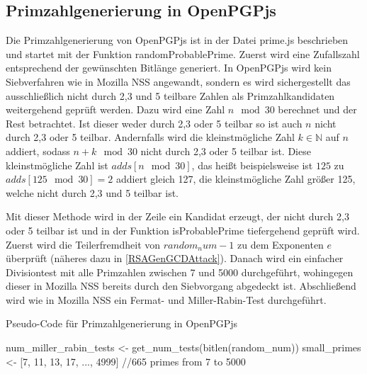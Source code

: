 \subsection{Primzahlgenerierung in OpenPGPjs}

Die Primzahlgenerierung von OpenPGPjs ist in der Datei prime.js beschrieben und startet mit der Funktion randomProbablePrime.
Zuerst wird eine Zufallszahl entsprechend der gewünschten Bitlänge generiert.
In OpenPGPjs wird kein Siebverfahren wie in Mozilla NSS angewandt, sondern es wird sichergestellt das ausschließlich nicht durch 2,3 und 5 teilbare Zahlen als Primzahlkandidaten weitergehend geprüft werden.
Dazu wird eine Zahl $n \mod 30$ berechnet und der Rest betrachtet.
Ist dieser weder durch 2,3 oder 5 teilbar so ist auch $n$ nicht durch 2,3 oder 5 teilbar.
Andernfalls wird die kleinstmögliche Zahl $k \in \mathbb{N}$ auf $n$ addiert, sodass $n + k \mod 30$ nicht durch 2,3 oder 5 teilbar ist.
Diese kleinstmögliche Zahl ist $adds[n \mod 30]$, das heißt beispielsweise ist $125$ zu $adds[125 \mod 30] = 2$ addiert gleich 127, die kleinstmögliche Zahl größer 125, welche nicht durch 2,3 und 5 teilbar ist.

Mit dieser Methode wird in der Zeile ein Kandidat erzeugt, der nicht durch 2,3 oder 5 teilbar ist und in der Funktion isProbablePrime tiefergehend geprüft wird.
Zuerst wird die Teilerfremdheit von $random_num -1$ zu dem Exponenten $e$ überprüft (näheres dazu in \ref{RSAGenGCDAttack}).
Danach wird ein einfacher Divisiontest mit alle Primzahlen zwischen 7 und 5000 durchgeführt, wohingegen dieser in Mozilla NSS bereits durch den Siebvorgang abgedeckt ist.
Abschließend wird wie in Mozilla NSS ein Fermat- und Miller-Rabin-Test durchgeführt.

\begin{algorithm}[h]
\DontPrintSemicolon
\caption{Pseudo-Code für Primzahlgenerierung in OpenPGPjs}
\label{alg:randomProbablePrimeOpenPGPjs}
num_miller_rabin_tests <- get_num_tests(bitlen(random_num))\;
small_primes <- [7, 11, 13, 17, ..., 4999] //665 primes from 7 to 5000\;


\end{algorithm}

